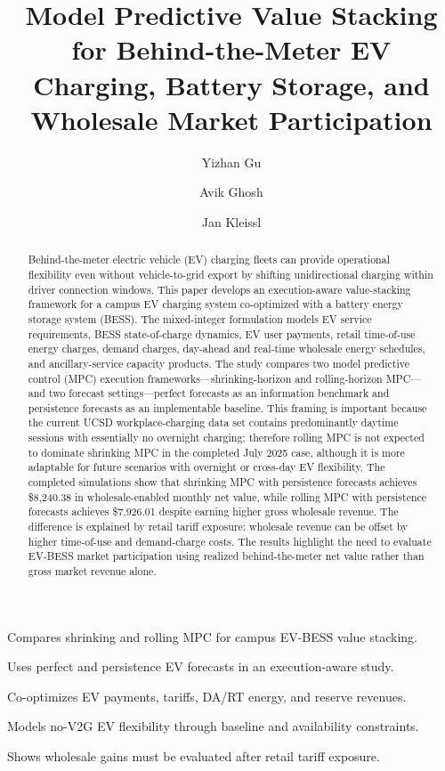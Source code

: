 \documentclass[final,5p,times]{elsarticle}
\begin{document}
\begin{frontmatter}

\title{Model Predictive Value Stacking for Behind-the-Meter EV Charging, Battery Storage, and Wholesale Market Participation}

\author[ucsd]{Yizhan Gu}
\author[ucsd]{Avik Ghosh}
\author[ucsd]{Jan Kleissl}


\begin{highlights}
\item Compares shrinking and rolling MPC for campus EV-BESS value stacking.
\item Uses perfect and persistence EV forecasts in an execution-aware study.
\item Co-optimizes EV payments, tariffs, DA/RT energy, and reserve revenues.
\item Models no-V2G EV flexibility through baseline and availability constraints.
\item Shows wholesale gains must be evaluated after retail tariff exposure.
\end{highlights}

\begin{abstract}
Behind-the-meter electric vehicle (EV) charging fleets can provide operational flexibility even without vehicle-to-grid export by shifting unidirectional charging within driver connection windows. This paper develops an execution-aware value-stacking framework for a campus EV charging system co-optimized with a battery energy storage system (BESS). The mixed-integer formulation models EV service requirements, BESS state-of-charge dynamics, EV user payments, retail time-of-use energy charges, demand charges, day-ahead and real-time wholesale energy schedules, and ancillary-service capacity products. The study compares two model predictive control (MPC) execution frameworks---shrinking-horizon and rolling-horizon MPC---and two forecast settings---perfect forecasts as an information benchmark and persistence forecasts as an implementable baseline. This framing is important because the current UCSD workplace-charging data set contains predominantly daytime sessions with essentially no overnight charging; therefore rolling MPC is not expected to dominate shrinking MPC in the completed July 2025 case, although it is more adaptable for future scenarios with overnight or cross-day EV flexibility. The completed simulations show that shrinking MPC with persistence forecasts achieves \$8,240.38 in wholesale-enabled monthly net value, while rolling MPC with persistence forecasts achieves \$7,926.01 despite earning higher gross wholesale revenue. The difference is explained by retail tariff exposure: wholesale revenue can be offset by higher time-of-use and demand-charge costs. The results highlight the need to evaluate EV-BESS market participation using realized behind-the-meter net value rather than gross market revenue alone.
\end{abstract}


\end{frontmatter}
\end{document}
